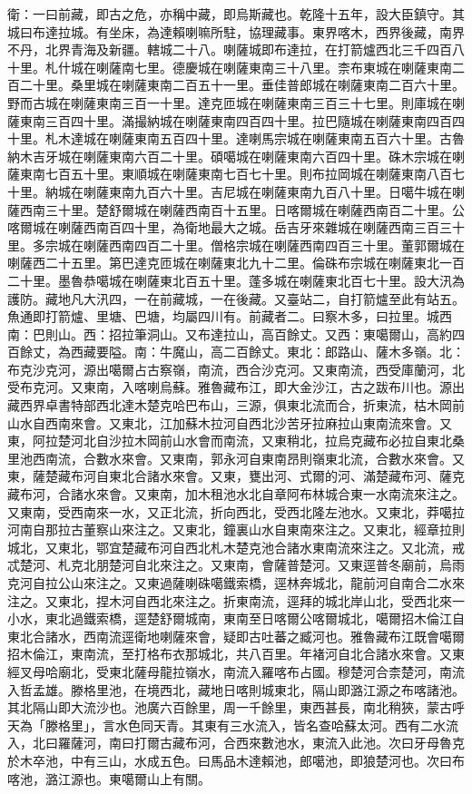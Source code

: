\begin{pinyinscope}
衛：一曰前藏，即古之危，亦稱中藏，即烏斯藏也。乾隆十五年，設大臣鎮守。其城曰布達拉城。有坐床，為達賴喇嘛所駐，協理藏事。東界喀木，西界後藏，南界不丹，北界青海及新疆。轄城二十八。喇薩城即布達拉，在打箭爐西北三千四百八十里。札什城在喇薩南七里。德慶城在喇薩東南三十八里。柰布東城在喇薩東南二百二十里。桑里城在喇薩東南二百五十一里。垂佳普郎城在喇薩東南二百六十里。野而古城在喇薩東南三百一十里。達克匝城在喇薩東南三百三十七里。則庫城在喇薩東南三百四十里。滿撮納城在喇薩東南四百四十里。拉巴隨城在喇薩東南四百四十里。札木達城在喇薩東南五百四十里。達喇馬宗城在喇薩東南五百六十里。古魯納木吉牙城在喇薩東南六百二十里。碩噶城在喇薩東南六百四十里。硃木宗城在喇薩東南七百五十里。東順城在喇薩東南七百七十里。則布拉岡城在喇薩東南八百七十里。納城在喇薩東南九百六十里。吉尼城在喇薩東南九百八十里。日噶牛城在喇薩西南三十里。楚舒爾城在喇薩西南百十五里。日喀爾城在喇薩西南百二十里。公喀爾城在喇薩西南百四十里，為衛地最大之城。岳吉牙來雜城在喇薩西南三百三十里。多宗城在喇薩西南四百二十里。僧格宗城在喇薩西南四百三十里。董郭爾城在喇薩西二十五里。第巴達克匝城在喇薩東北九十二里。倫硃布宗城在喇薩東北一百二十里。墨魯恭噶城在喇薩東北百五十里。蓬多城在喇薩東北百七十里。設大汛為護防。藏地凡大汛四，一在前藏城，一在後藏。又臺站二，自打箭爐至此有站五。魚通即打箭爐、里塘、巴塘，均屬四川有。前藏者二。曰察木多，曰拉里。城西南：巴則山。西：招拉筆洞山。又布達拉山，高百餘丈。又西：東噶爾山，高約四百餘丈，為西藏要隘。南：牛魔山，高二百餘丈。東北：郎路山、薩木多嶺。北：布克沙克河，源出噶爾占古察嶺，南流，西合沙克河。又東南流，西受庫蘭河，北受布克河。又東南，入喀喇烏蘇。雅魯藏布江，即大金沙江，古之跋布川也。源出藏西界卓書特部西北達木楚克哈巴布山，三源，俱東北流而合，折東流，枯木岡前山水自西南來會。又東北，江加蘇木拉河自西北沙苦牙拉麻拉山東南流來會。又東，阿拉楚河北自沙拉木岡前山水會而南流，又東稍北，拉烏克藏布必拉自東北桑里池西南流，合數水來會。又東南，郭永河自東南昂則嶺東北流，合數水來會。又東，薩楚藏布河自東北合諸水來會。又東，甕出河、式爾的河、滿楚藏布河、薩克藏布河，合諸水來會。又東南，加木租池水北自章阿布林城合東一水南流來注之。又東南，受西南來一水，又正北流，折向西北，受西北隆左池水。又東北，莽噶拉河南自那拉古董察山來注之。又東北，鐘裏山水自東南來注之。又東北，經章拉則城北，又東北，鄂宜楚藏布河自西北札木楚克池合諸水東南流來注之。又北流，戒忒楚河、札克北朋楚河自北來注之。又東南，會薩普楚河。又東逕普冬廟前，烏雨克河自拉公山來注之。又東過薩喇硃噶鐵索橋，逕林奔城北，龍前河自南合二水來注之。又東北，捏木河自西北來注之。折東南流，逕拜的城北岸山北，受西北來一小水，東北過鐵索橋，逕楚舒爾城南，東南至日喀爾公喀爾城北，噶爾招木倫江自東北合諸水，西南流逕衛地喇薩來會，疑即古吐蕃之臧河也。雅魯藏布江既會噶爾招木倫江，東南流，至打格布衣那城北，共八百里。年褚河自北合諸水來會。又東經叉母哈廟北，受東北薩母龍拉嶺水，南流入羅喀布占國。穆楚河合柰楚河，南流入哲孟雄。滕格里池，在境西北，藏地日喀則城東北，隔山即潞江源之布喀諸池。其北隔山即大流沙也。池廣六百餘里，周一千餘里，東西甚長，南北稍狹，蒙古呼天為「滕格里」，言水色同天青。其東有三水流入，皆名查哈蘇太河。西有二水流入，北曰羅薩河，南曰打爾古藏布河，合西來數池水，東流入此池。次曰牙母魯克於木卒池，中有三山，水成五色。曰馬品木達賴池，郎噶池，即狼楚河也。次曰布喀池，潞江源也。東噶爾山上有關。


\end{pinyinscope}

